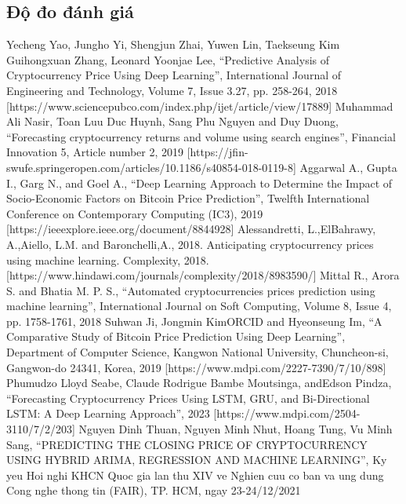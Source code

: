 \documentclass[conference]{IEEEtran}
\begin{document}
\subsection{Độ đo đánh giá}

\begin{thebibliography}{9}

 Yecheng Yao, Jungho Yi, Shengjun Zhai, Yuwen Lin, Taekseung Kim Guihongxuan Zhang, Leonard Yoonjae Lee, “Predictive Analysis of Cryptocurrency Price Using Deep Learning”, International Journal of Engineering and Technology, Volume 7, Issue 3.27, pp. 258-264, 2018 [https://www.sciencepubco.com/index.php/ijet/article/view/17889]
 Muhammad Ali Nasir, Toan Luu Duc Huynh, Sang Phu Nguyen and Duy Duong, “Forecasting cryptocurrency returns and volume using search engines”, Financial Innovation 5, Article number 2, 2019 [https://jfin-swufe.springeropen.com/articles/10.1186/s40854-018-0119-8]
 Aggarwal A., Gupta I., Garg N., and Goel A., “Deep Learning Approach to Determine the Impact of Socio-Economic Factors on Bitcoin Price Prediction”, Twelfth International Conference on Contemporary Computing (IC3), 2019 [https://ieeexplore.ieee.org/document/8844928]
 Alessandretti, L.,ElBahrawy, A.,Aiello, L.M. and Baronchelli,A., 2018. Anticipating cryptocurrency prices using machine learning. Complexity, 2018. [https://www.hindawi.com/journals/complexity/2018/8983590/]
 Mittal R., Arora S. and Bhatia M. P. S., “Automated cryptocurrencies prices prediction using machine learning”, International Journal on Soft Computing, Volume 8, Issue 4, pp. 1758-1761, 2018
 Suhwan Ji, Jongmin KimORCID and Hyeonseung Im, “A Comparative Study of Bitcoin Price Prediction Using Deep Learning”, Department of Computer Science, Kangwon National University, Chuncheon-si, Gangwon-do 24341, Korea, 2019 [https://www.mdpi.com/2227-7390/7/10/898]
 Phumudzo Lloyd Seabe, Claude Rodrigue Bambe Moutsinga, andEdson Pindza, “Forecasting Cryptocurrency Prices Using LSTM, GRU, and Bi-Directional LSTM: A Deep Learning Approach”, 2023 [https://www.mdpi.com/2504-3110/7/2/203]
 Nguyen Dinh Thuan, Nguyen Minh Nhut, Hoang Tung, Vu Minh Sang, “PREDICTING THE CLOSING PRICE OF CRYPTOCURRENCY USING HYBRID ARIMA, REGRESSION AND MACHINE LEARNING”, Ky yeu Hoi nghi KHCN Quoc gia lan thu XIV ve Nghien cuu co ban va ung dung Cong nghe thong tin (FAIR), TP. HCM, ngay 23-24/12/2021

\end{thebibliography}
\end{document}

